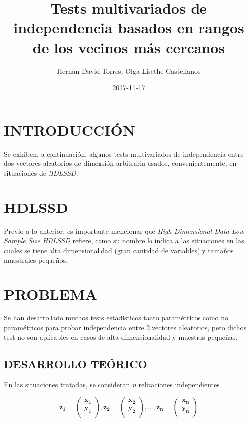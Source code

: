 \documentclass[]{book}
\title{Tests multivariados de independencia basados en rangos de los vecinos
más cercanos}
\author{Hernán David Torres, Olga Lisethe Castellanos}
\date{2017-11-17}
\begin{document}
\maketitle

{
\setcounter{tocdepth}{1}
\tableofcontents
}
\chapter{INTRODUCCIÓN}\label{introduccion}

Se exhiben, a continuación, algunos tests multivariados de independencia
entre dos vectores aleatorios de dimensión arbitraria usados,
convenientemente, en situaciones de \emph{\emph{HDLSSD}}.
\citep{sarkar2017some}

\chapter{HDLSSD}\label{intro}

Previo a lo anterior, es importante mencionar que \emph{\emph{High
Dimensional Data Low Sample Size}} \emph{\emph{HDLSSD}} refiere, como su
nombre lo indica a las situaciones en las cuales se tiene alta
dimensionalidad (gran cantidad de variables) y tamaños muestrales
pequeños.

\chapter{PROBLEMA}\label{problema}

Se han desarrollado muchos tests estadísticos tanto paramétricos como no
paramétricos para probar independencia entre 2 vectores aleatorios, pero
dichos test no son aplicables en casos de alta dimensionalidad y
muestras pequeñas.

\section{DESARROLLO TEÓRICO}\label{desarrollo-teorico}

En las situaciones tratadas, se consideran \emph{\emph{n}} relizaciones
independientes

\[
 \mathbf{\begin{equation} z_{1} =
\begin{pmatrix} x_1\\
y_1\\
\end{pmatrix} 
 ,  z_{2} =
\begin{pmatrix} x_2\\
y_2\\
\end{pmatrix}, ... ,    z_{n} =
\begin{pmatrix} x_n\\
y_n\\
\end{pmatrix}
\end{equation} }
\]
\end{document}
